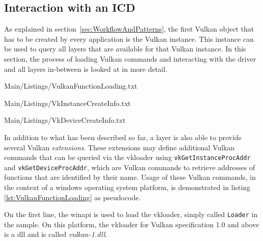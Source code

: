     \subsection{Interaction with an ICD}

      As explained in section~\ref{sec:WorkflowAndPatterns}, the first Vulkan object that has to be created by every application is the Vulkan instance.
      This instance can be used to query all layers that are available for that Vulkan instance.
      In this section, the process of loading Vulkan commands and interacting with the \gls{driver} and all layers in-between is looked at in more detail.

      
      {Main/Listings/VulkanFunctionLoading.txt}

      
      {Main/Listings/VkInstanceCreateInfo.txt}

      
      {Main/Listings/VkDeviceCreateInfo.txt}

      In addition to what has been described so far, a layer is also able to provide several Vulkan \textit{extensions}.
      These extensions may define additional Vulkan commands that can be queried via the \gls{vkloader} using \lstinline{vkGetInstanceProcAddr} and \lstinline{vkGetDeviceProcAddr}, which are Vulkan commands to retrieve addresses of functions that are identified by their name.
      Usage of these Vulkan commands, in the context of a \gls{windows} operating system platform, is demonstrated in listing \ref{lst:VulkanFunctionLoading} as pseudocode.

      On the first line, the \gls{winapi} is used to load the \gls{vkloader}, simply called \lstinline{Loader} in the sample.
      On this platform, the \gls{vkloader} for Vulkan specification 1.0 and above is a \gls{dll} and is called \textit{vulkan-1.dll}.

